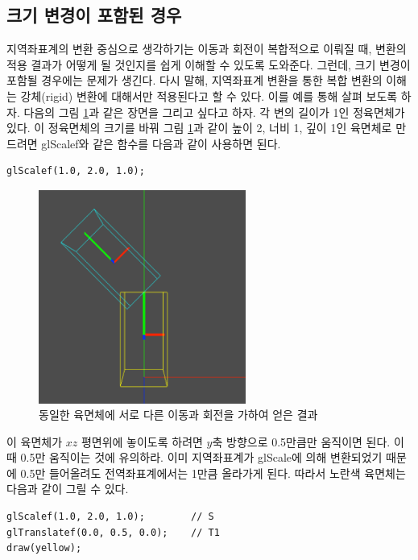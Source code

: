 \subsection{크기 변경이 포함된 경우}

지역좌표계의 변환 중심으로 생각하기는 이동과 회전이 복합적으로 이뤄질 때, 변환의 적용 결과가 어떻게 될 것인지를 쉽게 이해할 수 있도록 도와준다. 그런데, 크기 변경이 포함될 경우에는 문제가 생긴다.
다시 말해, 지역좌표계 변환을 통한 복합 변환의 이해는 강체(rigid) 변환에 대해서만 적용된다고 할 수 있다. 이를 예를 통해 살펴 보도록 하자.
다음의 그림 \ref{fig:OGL_transform:translateAndRot}과 같은 장면을 그리고 싶다고 하자. 각 변의 길이가 1인 정육면체가 있다. 이 정육면체의 크기를 바꿔 그림 \ref{fig:OGL_transform:translateAndRot}과 같이 높이 2, 너비 1, 깊이 1인 육면체로 만드려면 {\sf glScalef}와 같은 함수를 다음과 같이 사용하면 된다.

\begin{verbatim}
glScalef(1.0, 2.0, 1.0);
\end{verbatim}

\begin{figure}[h!]
  \centering
    \includegraphics[height=7cm]{OGL_transform/noScale.png}
    \caption{동일한 육면체에 서로 다른 이동과 회전을 가하여 얻은 결과}
    \label{fig:OGL_transform:translateAndRot}
\end{figure}


이 육면체가 $xz$ 평면위에 놓이도록 하려면 $y$축 방향으로 0.5만큼만 움직이면 된다. 이때 0.5만 움직이는 것에 유의하라. 
이미 지역좌표계가 {\sf glScale}에 의해 변환되었기 때문에 0.5만 들어올려도 전역좌표계에서는 1만큼 올라가게 된다.
따라서 노란색 육면체는 다음과 같이 그릴 수 있다.

\begin{verbatim}
glScalef(1.0, 2.0, 1.0);		// S
glTranslatef(0.0, 0.5, 0.0);	// T1
draw(yellow);
\end{verbatim}

